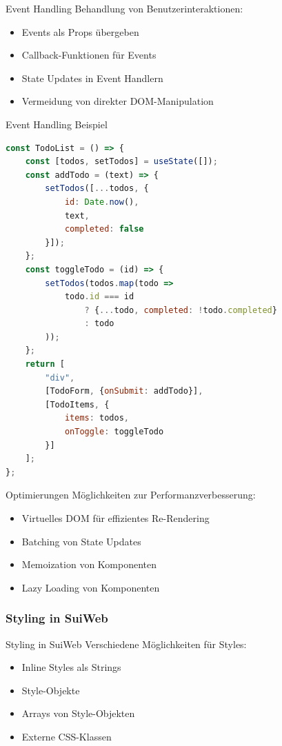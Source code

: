 \begin{concept}{Event Handling}
    Behandlung von Benutzerinteraktionen:
    \begin{itemize}
        \item Events als Props übergeben
        \item Callback-Funktionen für Events
        \item State Updates in Event Handlern
        \item Vermeidung von direkter DOM-Manipulation
    \end{itemize}
\end{concept}

\begin{KR}{Event Handling Beispiel}
\begin{lstlisting}[language=JavaScript, style=basesmol]
const TodoList = () => {
    const [todos, setTodos] = useState([]);
    const addTodo = (text) => {
        setTodos([...todos, {
            id: Date.now(),
            text,
            completed: false
        }]);
    };
    const toggleTodo = (id) => {
        setTodos(todos.map(todo =>
            todo.id === id
                ? {...todo, completed: !todo.completed}
                : todo
        ));
    };
    return [
        "div",
        [TodoForm, {onSubmit: addTodo}],
        [TodoItems, {
            items: todos,
            onToggle: toggleTodo
        }]
    ];
};
\end{lstlisting}
\end{KR}

\begin{corollary}{Optimierungen}
    Möglichkeiten zur Performanzverbesserung:
    \begin{itemize}
        \item Virtuelles DOM für effizientes Re-Rendering
        \item Batching von State Updates
        \item Memoization von Komponenten
        \item Lazy Loading von Komponenten
    \end{itemize}
\end{corollary}

\subsubsection{Styling in SuiWeb}

\begin{concept}{Styling in SuiWeb}
    Verschiedene Möglichkeiten für Styles:
    \begin{itemize}
        \item Inline Styles als Strings
        \item Style-Objekte
        \item Arrays von Style-Objekten
        \item Externe CSS-Klassen
    \end{itemize}
\end{concept}

